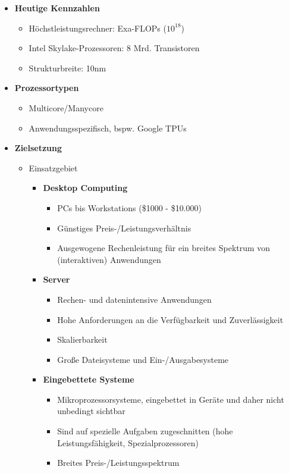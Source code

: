 \begin{itemize}
	\item \textbf{Heutige Kennzahlen}
	\begin{itemize}
		\item Höchstleistungsrechner: Exa-FLOPs ($10^{18}$)
		\item Intel Skylake-Prozessoren: 8 Mrd. Transistoren
		\item Strukturbreite: 10nm 
	\end{itemize}
	\item \textbf{Prozessortypen}
	\begin{itemize}
		\item Multicore/Manycore
		\item Anwendungsspezifisch, bspw. Google TPUs 
	\end{itemize}
	\item \textbf{Zielsetzung}
	\begin{itemize}
		\item Einsatzgebiet
		\begin{itemize}
			\item \textbf{Desktop Computing}
			\begin{itemize}
				\item PCs bis Workstations (\$1000 - \$10.000)
				\item Günstiges Preis-/Leistungsverhältnis
				\item Ausgewogene Rechenleistung für ein breites Spektrum von (interaktiven) Anwendungen
			\end{itemize}
			\item \textbf{Server}
			\begin{itemize}
				\item Rechen- und datenintensive Anwendungen
				\item Hohe Anforderungen an die Verfügbarkeit und Zuverlässigkeit
				\item Skalierbarkeit
				\item Große Dateisysteme und Ein-/Ausgabesysteme
			\end{itemize}
			\item \textbf{Eingebettete Systeme}
			\begin{itemize}
				\item Mikroprozessorsysteme, eingebettet in Geräte und daher nicht unbedingt sichtbar
				\item Sind auf spezielle Aufgaben zugeschnitten (hohe Leistungsfähigkeit, Spezialprozessoren)
				\item Breites Preis-/Leistungsspektrum

\end{itemize}
\end{itemize}
\end{itemize}
\end{itemize}
